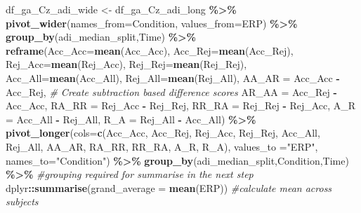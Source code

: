 \documentclass[
]{article}
\newenvironment{Shaded}{\begin{snugshade}}{\end{snugshade}}
\newcommand{\AttributeTok}[1]{\textcolor[rgb]{0.13,0.29,0.53}{#1}}
\newcommand{\CommentTok}[1]{\textcolor[rgb]{0.56,0.35,0.01}{\textit{#1}}}
\newcommand{\FunctionTok}[1]{\textcolor[rgb]{0.13,0.29,0.53}{\textbf{#1}}}
\newcommand{\NormalTok}[1]{#1}
\newcommand{\OtherTok}[1]{\textcolor[rgb]{0.56,0.35,0.01}{#1}}
\newcommand{\SpecialCharTok}[1]{\textcolor[rgb]{0.81,0.36,0.00}{\textbf{#1}}}
\newcommand{\StringTok}[1]{\textcolor[rgb]{0.31,0.60,0.02}{#1}}
\begin{document}
\begin{Shaded}
\begin{Highlighting}[]
\NormalTok{df\_ga\_Cz\_adi\_wide }\OtherTok{\textless{}{-}}\NormalTok{ df\_ga\_Cz\_adi\_long }\SpecialCharTok{\%\textgreater{}\%}
  \FunctionTok{pivot\_wider}\NormalTok{(}\AttributeTok{names\_from=}\NormalTok{Condition, }\AttributeTok{values\_from=}\NormalTok{ERP) }\SpecialCharTok{\%\textgreater{}\%}
  \FunctionTok{group\_by}\NormalTok{(adi\_median\_split,Time) }\SpecialCharTok{\%\textgreater{}\%}
  \FunctionTok{reframe}\NormalTok{(}\AttributeTok{Acc\_Acc=}\FunctionTok{mean}\NormalTok{(Acc\_Acc),}
          \AttributeTok{Acc\_Rej=}\FunctionTok{mean}\NormalTok{(Acc\_Rej),}
          \AttributeTok{Rej\_Acc=}\FunctionTok{mean}\NormalTok{(Rej\_Acc),}
          \AttributeTok{Rej\_Rej=}\FunctionTok{mean}\NormalTok{(Rej\_Rej),}
          \AttributeTok{Acc\_All=}\FunctionTok{mean}\NormalTok{(Acc\_All),}
          \AttributeTok{Rej\_All=}\FunctionTok{mean}\NormalTok{(Rej\_All),}
         \AttributeTok{AA\_AR =}\NormalTok{ Acc\_Acc }\SpecialCharTok{{-}}\NormalTok{ Acc\_Rej, }\CommentTok{\# Create subtraction based difference scores}
         \AttributeTok{AR\_AA =}\NormalTok{ Acc\_Rej }\SpecialCharTok{{-}}\NormalTok{ Acc\_Acc,}
         \AttributeTok{RA\_RR =}\NormalTok{ Rej\_Acc }\SpecialCharTok{{-}}\NormalTok{ Rej\_Rej,}
         \AttributeTok{RR\_RA =}\NormalTok{ Rej\_Rej }\SpecialCharTok{{-}}\NormalTok{ Rej\_Acc,}
         \AttributeTok{A\_R =}\NormalTok{ Acc\_All }\SpecialCharTok{{-}}\NormalTok{ Rej\_All,}
         \AttributeTok{R\_A =}\NormalTok{ Rej\_All }\SpecialCharTok{{-}}\NormalTok{ Acc\_All) }\SpecialCharTok{\%\textgreater{}\%}
  \FunctionTok{pivot\_longer}\NormalTok{(}\AttributeTok{cols=}\FunctionTok{c}\NormalTok{(Acc\_Acc, Acc\_Rej, Rej\_Acc, Rej\_Rej, Acc\_All, Rej\_All, }
\NormalTok{                      AA\_AR, RA\_RR, RR\_RA, A\_R, R\_A), }\AttributeTok{values\_to =}\StringTok{"ERP"}\NormalTok{, }\AttributeTok{names\_to=}\StringTok{"Condition"}\NormalTok{) }\SpecialCharTok{\%\textgreater{}\%}
  \FunctionTok{group\_by}\NormalTok{(adi\_median\_split,Condition,Time) }\SpecialCharTok{\%\textgreater{}\%} \CommentTok{\#grouping required for summarise in the next step}
\NormalTok{  dplyr}\SpecialCharTok{::}\FunctionTok{summarise}\NormalTok{(}\AttributeTok{grand\_average =} \FunctionTok{mean}\NormalTok{(ERP)) }\CommentTok{\#calculate mean across subjects}


\end{Highlighting}
\end{Shaded}
\end{document}
